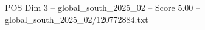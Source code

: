 \begin{textsample}{POS Dim 3 – global\_south\_2025\_02 – Score 5.00 – global\_south\_2025\_02/120772884.txt}
\end{textsample}
